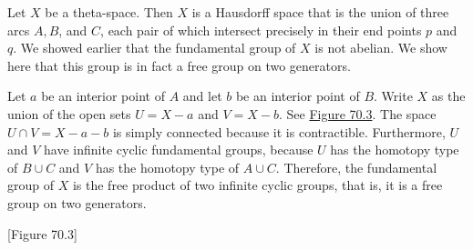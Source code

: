 \begin{centeredblock}
\begin{example}
\label{ex:\thesection.\theexample}
Let \(X\) be a theta-space. Then \(X\) is a Hausdorff space that is the union of three arcs \(A,B\), and \(C\), each pair of which intersect precisely in their end points \(p\) and \(q\). We showed earlier that the fundamental group of \(X\) is not abelian. We show here that this group is in fact a free group on two generators.

Let \(a\) be an interior point of \(A\) and let \(b\) be an interior point of \(B\). Write \(X\) as the union of the open sets \(U = X - a\) and \(V = X - b\). See \hyperref[fig:70.3]{Figure 70.3}. The space \(U \cap V = X - a - b\) is simply connected because it is contractible. Furthermore, \(U\) and \(V\) have infinite cyclic fundamental groups, because \(U\) has the homotopy type of \(B \cup C\) and \(V\) has the homotopy type of \(A \cup C\). Therefore, the fundamental group of \(X\) is the free product of two infinite cyclic groups, that is, it is a free group on two generators.
\end{example}
\end{centeredblock}

[Figure 70.3]
